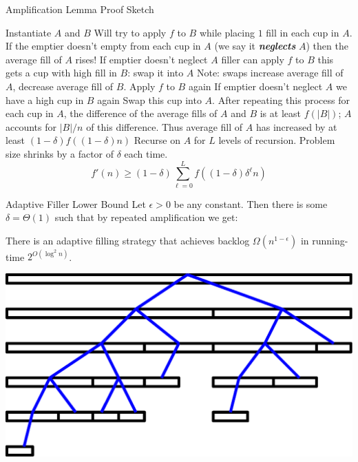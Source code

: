 \documentclass[xcolor=x11names, svgnames, rgb]{beamer}
\newcommand{\defn}[1]       {{\textit{\textbf{\boldmath #1}}}}
\begin{document}
\begin{frame}[t]{Amplification Lemma Proof Sketch}
\begin{overprint}
  \end{overprint}
  \begin{overprint}
     Instantiate $A$ and $B$
     Will try to apply $f$ to $B$ while placing $1$ fill in each cup in $A$. 
     If the emptier doesn't empty from each cup in $A$ (we say it \defn{neglects} $A$) then the average fill of $A$ rises!
     If emptier doesn't neglect $A$ filler can apply $f$ to $B$
     this gets a cup with high fill in $B$: swap it into $A$
     Note: swaps increase average fill of $A$, decrease average fill of $B$.
     Apply $f$ to $B$ again
     If emptier doesn't neglect $A$ we have a high cup in $B$ again
     Swap this cup into $A$.
     After repeating this process for
    each cup in $A$, the difference of the average
    fills of $A$ and $B$ is at least $f(|B|)$; $A$
    accounts for $|B|/n$ of this difference. Thus
    average fill of $A$ has increased by at least
    $(1-\delta)f((1-\delta)n)$
     Recurse on $A$ for $L$ levels of recursion. Problem size shrinks by a factor of $\delta$ each time. 
     $$f'(n) \ge (1-\delta)\sum_{\ell=0}^L f((1-\delta)\delta^\ell n)$$
  \end{overprint}
\end{frame}

\begin{frame}[t]{Adaptive Filler Lower Bound}
  Let $\epsilon > 0$ be any constant. Then there is some $\delta=\Theta(1)$ such that by repeated amplification we get: 
  \begin{theorem}
    There is an adaptive filling strategy that achieves
    backlog $\Omega(n^{1-\epsilon})$  in running-time $2^{O(\log^2 n)}$.
  \end{theorem}
  \vspace{0.5cm}
  \includegraphics[width=0.7\linewidth]{amplificationImgs/quasipoly_cor.eps}
\end{frame}
\end{document}
